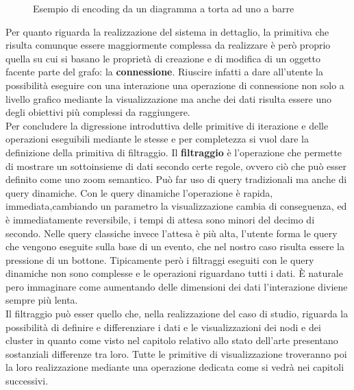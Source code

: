 {\begin{figure}[!htb]
\begin{center}
	\end{center}
	\caption{Esempio di encoding da un diagramma a torta ad uno a barre\label{fig:pieToBar}}
\end{figure}
Per quanto riguarda la realizzazione del sistema in dettaglio, la primitiva che risulta comunque essere maggiormente complessa da realizzare è però proprio quella su cui si basano le proprietà di creazione e di modifica di un oggetto facente parte del grafo: la \textbf{connessione}.
Riuscire infatti a dare all'utente la possibilità eseguire con una interazione una operazione di connessione non solo a livello grafico mediante la visualizzazione ma anche dei dati risulta essere uno degli obiettivi più complessi da raggiungere.\\
Per concludere la digressione introduttiva delle primitive di iterazione e delle operazioni eseguibili mediante le stesse e per completezza si vuol dare la definizione della primitiva di filtraggio.
Il \textbf{filtraggio} è l’operazione che permette di mostrare un sottoinsieme di dati secondo certe regole, ovvero ciò che può esser definito come uno zoom semantico. Può far uso di query tradizionali ma anche di query dinamiche. Con le query dinamiche l’operazione è rapida, immediata,cambiando un parametro la visualizzazione cambia di conseguenza, ed è immediatamente reversibile, i tempi di attesa sono minori del decimo di secondo. Nelle query classiche invece l’attesa è più alta, l’utente forma le query che vengono eseguite sulla base di un evento, che nel nostro caso risulta essere la pressione di un bottone. Tipicamente però i filtraggi eseguiti con le query dinamiche non sono complesse e le operazioni riguardano tutti i dati. È naturale pero immaginare come aumentando delle dimensioni dei dati l’interazione diviene sempre più lenta.\\ 
Il filtraggio può esser quello che, nella realizzazione del caso di studio, riguarda la possibilità di definire e differenziare i dati e le visualizzazioni dei nodi e dei cluster in quanto come visto nel capitolo relativo allo stato dell'arte presentano sostanziali differenze tra loro. 
Tutte le primitive di visualizzazione troveranno poi la loro realizzazione mediante una operazione dedicata come si vedrà nei capitoli successivi.
}
